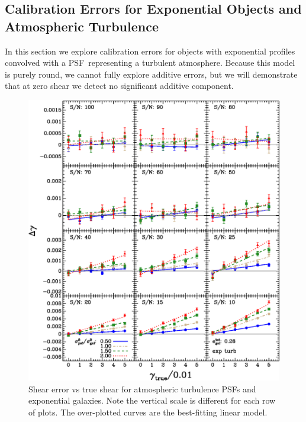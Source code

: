 \documentclass[10pt,preprint]{aastex}
\newcommand{\psf}{PSF}
\begin{document}
\subsection{Calibration Errors for Exponential Objects and Atmospheric Turbulence}

In this section we explore calibration errors for objects with exponential
profiles convolved with a \psf\ representing a turbulent atmosphere.  Because
this model is purely round, we cannot fully explore additive errors, but we
will demonstrate that at zero shear we detect no significant additive component.


\begin{figure}[p] \centering
 \centering 
 \includegraphics[scale=1.1]{figures/set-s2n-et02-vs-shear.eps}

 \caption{Shear error vs true shear for atmospheric turbulence \psf s
 and exponential galaxies.  Note the vertical scale is different for each row
 of plots.  The over-plotted curves are the best-fitting linear model.}
 \label{fig:etdiffvsshroundpsf}

\end{figure}
\end{document}
